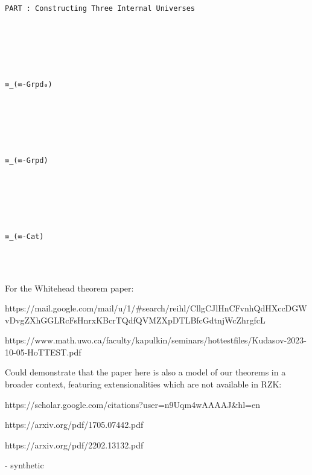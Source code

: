 \documentclass{book}
\theoremstyle{definition}
\newcounter{pcounter}
\renewcommand{\chapter}[1]{
\newpage
{
\Huge 
\begin{center}
\ \\
\ \\
\thispagestyle{empty}
\texttt{#1}
\end{center}}
\ \\
\ \\
}
\newcounter{partcount}
\renewcommand{\part}[1]{
\newpage
{
\Huge 
\begin{center}
\ \\
\ \\
\ \\
\ \\
\ \\
\ \\
\thispagestyle{empty}
\texttt{PART {\thepartcount}: #1}
\stepcounter{partcount}
\end{center}}
\ \\
\ \\
}
\begin{document}
\fi



\part{Constructing Three Internal Universes}


\chapter{∞\_(∞-Grpd₀)}




\chapter{∞\_(∞-Grpd)}



\chapter{∞\_(∞-Cat)}




\iffalse

\iffalse
For the Whitehead theorem paper:

https://mail.google.com/mail/u/1/#search/reihl/CllgCJlHnCFvnhQdHXccDGWvDvgZXhGGLRcFsHnrxKBcrTQdfQVMZXpDTLBfcGdtnjWcZhrgfcL

https://www.math.uwo.ca/faculty/kapulkin/seminars/hottestfiles/Kudasov-2023-10-05-HoTTEST.pdf

Could demonstrate that the paper here is also a model of our theorems in a broader context, featuring extensionalities which are not available in RZK:

https://scholar.google.com/citations?user=n9Uqm4wAAAAJ&hl=en

https://arxiv.org/pdf/1705.07442.pdf

https://arxiv.org/pdf/2202.13132.pdf

- synthetic
\end{document}
